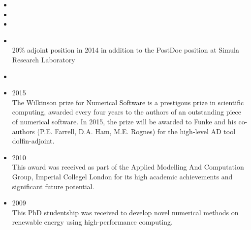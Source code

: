 \documentclass[11pt]{article}
\newenvironment{outerlist}[1][\enskip\textbullet]
        {\begin{itemize}[ #1]}{\end{itemize}}
\begin{document}
\begin{outerlist}
\item[] 
\item[] 
\item[] 
\item[] \\
    20\% adjoint position in 2014 in addition to the PostDoc position at Simula Research Laboratory
\item[] 
\end{outerlist}

\begin{outerlist}
\item[] 2015\\
    The Wilkinson prize for Numerical Software is a prestigous prize in scientific computing, awarded every four years to the authors of an outstanding piece of numerical software.
    In 2015, the prize will be awarded to Funke and his co-authors (P.E. Farrell, D.A. Ham, M.E. Rognes) for the high-level AD tool dolfin-adjoint.
\item[] 2010\\
This award was received as part of the Applied Modelling And Computation Group, Imperial Collegel London for its high academic achievements and significant future potential.
\item[] 2009\\
    This PhD studentship was received to develop novel numerical methods on renewable energy using high-performance computing.
\end{outerlist}
\end{document}
